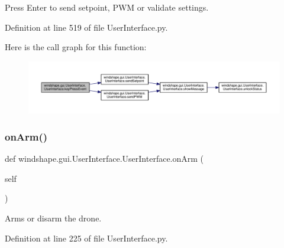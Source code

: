 \begin{DoxyVerb}Press Enter to send setpoint, PWM or validate settings.\end{DoxyVerb}
 

Definition at line 519 of file User\+Interface.\+py.

Here is the call graph for this function\+:\nopagebreak
\begin{figure}[H]
\begin{center}
\leavevmode
\includegraphics[width=350pt]{classwindshape_1_1gui_1_1_user_interface_1_1_user_interface_a8e6637c0d91a25ee172f854284f9f732_cgraph}
\end{center}
\end{figure}
\mbox{\label{classwindshape_1_1gui_1_1_user_interface_1_1_user_interface_aa1efa5b7a6485835efc4f4d7fa846648}} 
\subsubsection{\texorpdfstring{on\+Arm()}{onArm()}}
{\footnotesize\ttfamily def windshape.\+gui.\+User\+Interface.\+User\+Interface.\+on\+Arm (\begin{DoxyParamCaption}\item[{}]{self }\end{DoxyParamCaption})}

\begin{DoxyVerb}Arms or disarm the drone.\end{DoxyVerb}
 

Definition at line 225 of file User\+Interface.\+py.

